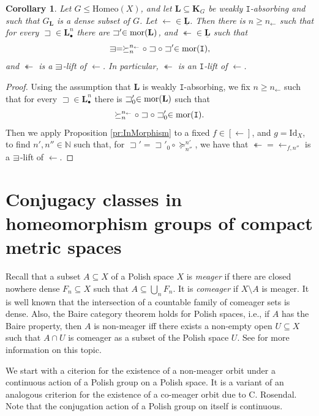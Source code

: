 \documentclass[12pt]{amsart}
\numberwithin{equation}{section}
\theoremstyle{plain}
\newtheorem{corollary}[theorem]{\bf Corollary}
\theoremstyle{definition}
\newcommand{\sqni}{\mathrel{\vphantom{\sqsupset}\text{\mathsurround=0pt\ooalign{$\sqsupset$\cr$-$\cr}}}}
\newcommand \Homeo{ \mbox{Homeo}}
\newcommand \Id{ \mbox{Id}}
\newcommand \sqsp{\sqsupset}
\newcommand \la{\leftarrow}
\newcommand \tla{\twoheadleftarrow}
\newcommand \mor{{\rm{mor}}}
\newcommand \KKb{\mathbf{K}}
\newcommand \LLb{\mathbf{L}}
\newcommand \LLub{\underline{\mathbf{L}}}
\newcommand \NN{\mathbb{N}}
\newcommand \It{\mathtt{I}}
\begin{document}
\begin{corollary}
	\label{co:UpwardClosed}
	Let $G \leq \Homeo(X)$, and let $\LLb \subseteq \KKb_G$ be weakly $\It$-absorbing and such that $G_\LLb$ is a dense subset of $G$. Let $\la \in \LLub$. Then there is $n \geq n_\la$ such that for every $\sqsp \in \LLb^n_\bullet$ there are $\sqsp' \in \mor(\LLb)$, and $\twoheadleftarrow \in \LLub$ such that  $$\sqni=\succeq^{n_\la}_n \circ \sqsp \circ \sqsp' \in \mor(\It),$$ and $\twoheadleftarrow$ is a $\sqni$-lift of $\la$. In particular, $\tla$ is an $\It$-lift of $\la$.
\end{corollary}

\begin{proof}
 Using the assumption that $\LLb$ is weakly $\It$-absorbing, we fix $n \geq n_\la$ such that for every $\sqsp \in \LLb^n_\bullet$ there is $\sqsp'_0 \in \mor(\LLb)$ such that $$\succeq^{n_\la}_n \circ \sqsp \circ \sqsp'_0 \in \mor(\It).$$ Then we apply Proposition \ref{pr:InMorphism} to a fixed $f \in [\la]$, and $g=\Id_X$, to find $n',n'' \in \NN$ such that, for $\sqsp'=\sqsp'_0 \circ \succeq^{n'}_{n''}$, we have  that $\twoheadleftarrow=\la_{f,n''}$ is a $\sqni$-lift of $\la$.
\end{proof}




\section{Conjugacy classes in homeomorphism groups of compact metric spaces}
Recall that a subset $A \subseteq X$ of a Polish space $X$ is \emph{meager} if there are closed nowhere dense $F_n \subseteq X$ such that $A \subseteq \bigcup_n F_n$. It is \emph{comeager} if $X \setminus A$ is meager. It is well known that the intersection of a countable family of comeager sets is dense. Also,  the Baire category theorem holds for Polish spaces, i.e., if $A$ has the Baire property, then  $A$ is non-meager iff there exists a non-empty open $U \subseteq X$ such that $A \cap U$ is comeager as a subset of the Polish space $U$. See \cite{Gao} for more information on this topic.

We start with a citerion for the existence of a non-meager orbit under a continuous action of a Polish group on a Polish space. It is a variant of an analogous criterion for the existence of a co-meager orbit due to C. Rosendal. Note that the conjugation action of a Polish group on itself is continuous.
\end{document}
